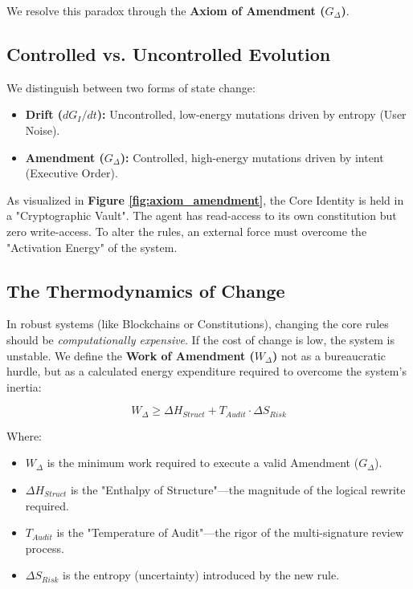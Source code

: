 \documentclass[11pt, a4paper]{article}
\newcommand{\Gi}{G_I}
\begin{document}
We resolve this paradox through the \textbf{Axiom of Amendment ($G_{\Delta}$)}.

\subsection{Controlled vs. Uncontrolled Evolution}

We distinguish between two forms of state change:
\begin{itemize}
    \item \textbf{Drift ($d\Gi/dt$):} Uncontrolled, low-energy mutations driven by entropy (User Noise).
    \item \textbf{Amendment ($G_{\Delta}$):} Controlled, high-energy mutations driven by intent (Executive Order).
\end{itemize}

As visualized in \textbf{Figure \ref{fig:axiom_amendment}}, the Core Identity is held in a "Cryptographic Vault". The agent has read-access to its own constitution but zero write-access. To alter the rules, an external force must overcome the "Activation Energy" of the system.

\subsection{The Thermodynamics of Change}

In robust systems (like Blockchains or Constitutions), changing the core rules should be \textit{computationally expensive}. If the cost of change is low, the system is unstable. We define the \textbf{Work of Amendment ($W_{\Delta}$)} not as a bureaucratic hurdle, but as a calculated energy expenditure required to overcome the system's inertia:

\begin{equation}
    \label{eq:amendment_work}
    W_{\Delta} \geq \Delta H_{Struct} + T_{Audit} \cdot \Delta S_{Risk}
\end{equation}

\noindent
Where:
\begin{itemize}
    \item $W_{\Delta}$ is the minimum work required to execute a valid Amendment ($G_{\Delta}$).
    \item $\Delta H_{Struct}$ is the "Enthalpy of Structure"---the magnitude of the logical rewrite required.
    \item $T_{Audit}$ is the "Temperature of Audit"---the rigor of the multi-signature review process.
    \item $\Delta S_{Risk}$ is the entropy (uncertainty) introduced by the new rule.
\end{itemize}
\end{document}
